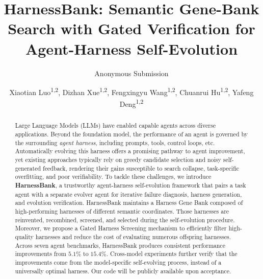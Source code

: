 \documentclass[letterpaper]{article} %
\title{HarnessBank: Semantic Gene-Bank Search with Gated Verification for Agent-Harness Self-Evolution}
\author{Anonymous Submission}
\author{
    Xiaotian Luo\textsuperscript{\rm 1,\rm 2},
    Dizhan Xue\textsuperscript{\rm 1,\rm 2},
    Fengxingyu Wang\textsuperscript{\rm 1,\rm 2},
    Chuanrui Hu\textsuperscript{\rm 1,\rm 2},
    Yafeng Deng\textsuperscript{\rm 1,\rm 2}\corresponding
  }
\begin{document}
\maketitle

\begin{abstract}
Large Language Models (LLMs) have enabled capable agents across diverse applications. Beyond the foundation model, the performance of an agent is governed by the surrounding \emph{agent harness}, including prompts, tools, control loops, etc. Automatically evolving this harness offers a promising pathway to agent improvement, yet existing approaches typically rely on greedy candidate selection and noisy self-generated feedback, rendering their gains susceptible to search collapse, task-specific overfitting, and poor verifiability.
%
To tackle these challenges, we introduce \textbf{HarnessBank}, a trustworthy agent-harness self-evolution framework that pairs a task agent with a separate evolver agent for iterative failure diagnosis, harness generation, and evolution verification. 
%
HarnessBank maintains a Harness Gene Bank composed of high-performing harnesses of different semantic coordinates. Those harnesses are reinvented, recombined, screened, and selected during the self-evolution procedure.
%
Moreover, we propose a Gated Harness Screening mechanism to efficiently filter high-quality harnesses and reduce the cost of evaluating numerous offspring harnesses.
%
Across seven agent benchmarks, HarnessBank produces consistent performance improvements from $5.1\%$ to $15.4\%$. Cross-model experiments further verify that the improvements come from the model-specific self-evolving process, instead of a universally optimal harness. 
%
Our code will be publicly available upon acceptance.
\end{abstract}








\end{document}

